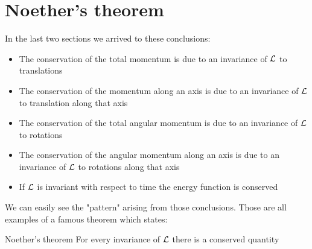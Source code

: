 \section{Noether's theorem}
In the last two sections we arrived to these conclusions:
\begin{itemize}
    \item The conservation of the total momentum is due to an invariance of $\mathcal{L}$ to translations
    \item The conservation of the momentum along an axis is due to an invariance of $\mathcal{L}$ to translation along that axis
    \item The conservation of the total angular momentum is due to an invariance of $\mathcal{L}$ to rotations
    \item The conservation of the angular momentum along an axis is due to an invariance of $\mathcal{L}$ to rotations along that axis
    \item If $\mathcal{L}$ is invariant with respect to time the energy function is conserved
\end{itemize}
We can easily see the "pattern" arising from those conclusions. Those are all examples of a famous theorem which states:
\begin{theorem}{Noether's theorem}
    For every invariance of $\mathcal{L}$ there is a conserved quantity
\end{theorem}

